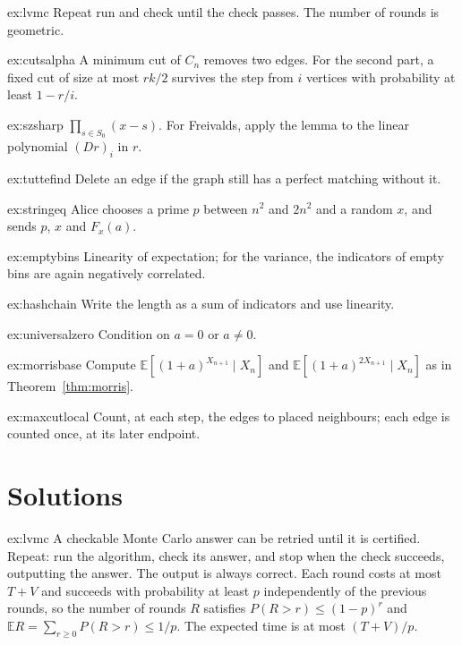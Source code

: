 \begin{hint}{ex:lvmc}
Repeat run and check until the check passes. The number of rounds is geometric.
\end{hint}
\begin{hint}{ex:cutsalpha}
A minimum cut of $C_n$ removes two edges. For the second part, a fixed cut of size at most $rk/2$ survives the step from $i$ vertices with probability at least $1-r/i$.
\end{hint}
\begin{hint}{ex:szsharp}
$\prod_{s\in S_0}(x-s)$. For Freivalds, apply the lemma to the linear polynomial $(Dr)_i$ in $r$.
\end{hint}
\begin{hint}{ex:tuttefind}
Delete an edge if the graph still has a perfect matching without it.
\end{hint}
\begin{hint}{ex:stringeq}
Alice chooses a prime $p$ between $n^2$ and $2n^2$ and a random $x$, and sends $p$, $x$ and $F_x(a)$.
\end{hint}
\begin{hint}{ex:emptybins}
Linearity of expectation; for the variance, the indicators of empty bins are again negatively correlated.
\end{hint}
\begin{hint}{ex:hashchain}
Write the length as a sum of indicators and use linearity.
\end{hint}
\begin{hint}{ex:universalzero}
Condition on $a=0$ or $a\ne0$.
\end{hint}
\begin{hint}{ex:morrisbase}
Compute $\mathbb E[(1+a)^{X_{n+1}}\mid X_n]$ and $\mathbb E[(1+a)^{2X_{n+1}}\mid X_n]$ as in Theorem~\ref{thm:morris}.
\end{hint}
\begin{hint}{ex:maxcutlocal}
Count, at each step, the edges to placed neighbours; each edge is counted once, at its later endpoint.
\end{hint}

\section{Solutions}

\begin{solution}{ex:lvmc}
\idea A checkable Monte Carlo answer can be retried until it is certified.
\writeup Repeat: run the algorithm, check its answer, and stop when the check succeeds, outputting the answer. The output is always correct. Each round costs at most $T+V$ and succeeds with probability at least $p$ independently of the previous rounds, so the number of rounds $R$ satisfies
$P(R>r)\le(1-p)^r$ and $\mathbb ER=\sum_{r\ge0}P(R>r)\le1/p$. The expected time is at most $(T+V)/p$.
\end{solution}

